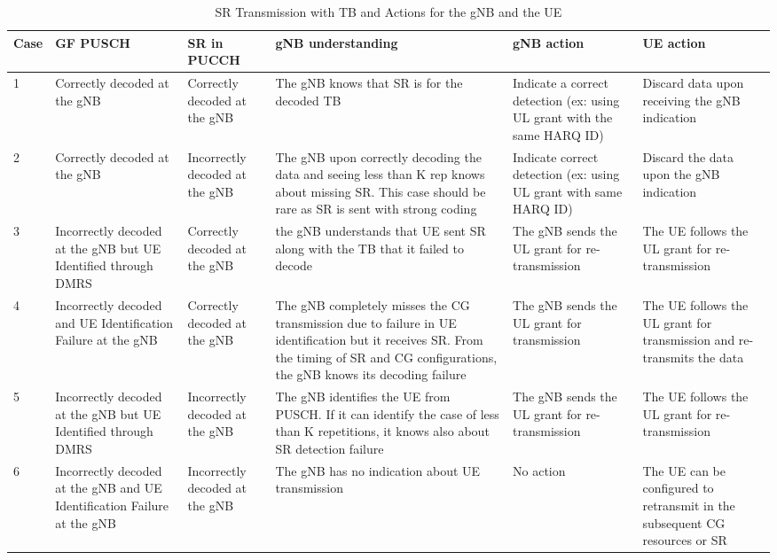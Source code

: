 \documentclass{ieeeaccess}
\begin{document}
\begin{table}[htbp]
\caption{SR Transmission with TB and Actions for the gNB and the UE}
\begin{center}
\begin{tabular}{|p{1.5em}|p{10em}|p{9em}|p{16em}|p{9em}|p{9em}|}
 \hline
 \textbf{Case} & \textbf{GF PUSCH} & \textbf{SR in PUCCH} & \textbf{gNB understanding} & \textbf{gNB action} & \textbf{UE action}\\ 
 \hline
 1 & Correctly decoded at the gNB & Correctly decoded at the gNB & The gNB knows that SR is for the decoded TB & Indicate a correct detection (ex: using UL grant with the same HARQ ID) & Discard data upon receiving the gNB indication\\
 \hline
 2 &  Correctly decoded at the gNB & Incorrectly decoded at the gNB & The gNB upon correctly decoding the data and seeing less than K rep knows about missing SR. This case should be rare as SR is sent with strong coding & Indicate correct detection (ex: using UL grant with same HARQ ID) & Discard the data upon the gNB indication\\
\hline
3 & Incorrectly decoded at the gNB but UE Identified through DMRS & Correctly decoded at the gNB & the gNB understands that UE sent SR along with the TB that it failed to decode & The gNB sends the UL grant for re-transmission & The UE follows the UL grant for re-transmission\\
\hline
4 & Incorrectly decoded and UE Identification Failure at the gNB & Correctly decoded at the gNB & The gNB completely misses the CG transmission due to failure in UE identification but it receives SR. From the timing of SR and CG configurations, the gNB knows its decoding failure & The gNB sends the UL grant for transmission & The UE follows the UL grant for transmission and re-transmits the data\\
\hline
5 & Incorrectly decoded at the gNB but UE Identified through DMRS & Incorrectly decoded at the gNB & The gNB identifies the UE from PUSCH. If it can identify the case of less than K repetitions, it knows also about SR detection failure & The gNB sends the UL grant for re-transmission & The UE follows the UL grant for re-transmission\\
\hline
 6 & Incorrectly decoded at the gNB and UE Identification Failure at the gNB & Incorrectly decoded at the gNB & The gNB has no indication about UE transmission & No action & The UE can be configured to
retransmit in the subsequent CG resources or SR\\
 

 
 \hline
\end{tabular}
\label{tab2}
\end{center}

\end{table}
\end{document}

